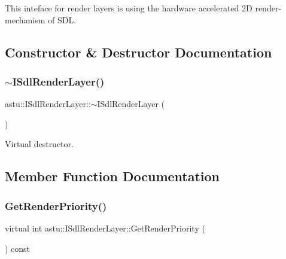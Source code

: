 This inteface for render layers is using the hardware accelerated 2D render-\/mechanism of S\+DL. 

\subsection{Constructor \& Destructor Documentation}
\mbox{\label{classastu_1_1ISdlRenderLayer_af507055c193d430822d5aadb6cbaf6a9}} 
\subsubsection{\texorpdfstring{$\sim$\+I\+Sdl\+Render\+Layer()}{~ISdlRenderLayer()}}
{\footnotesize\ttfamily astu\+::\+I\+Sdl\+Render\+Layer\+::$\sim$\+I\+Sdl\+Render\+Layer (\begin{DoxyParamCaption}{ }\end{DoxyParamCaption})\hspace{0.3cm}{\ttfamily [inline]}}

Virtual destructor. 

\subsection{Member Function Documentation}
\mbox{\label{classastu_1_1ISdlRenderLayer_a623b411a1afa967bdaa879f5075eec43}} 
\subsubsection{\texorpdfstring{Get\+Render\+Priority()}{GetRenderPriority()}}
{\footnotesize\ttfamily virtual int astu\+::\+I\+Sdl\+Render\+Layer\+::\+Get\+Render\+Priority (\begin{DoxyParamCaption}{ }\end{DoxyParamCaption}) const\hspace{0.3cm}{\ttfamily [pure virtual]}}


